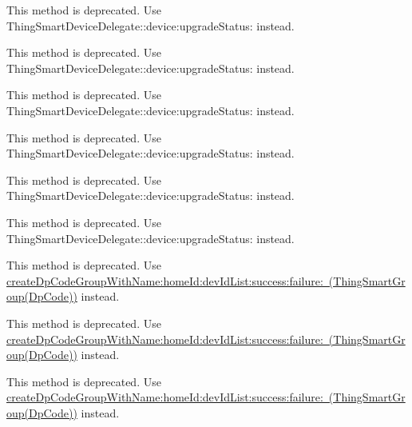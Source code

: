 \begin{DoxyRefList}
\label{deprecated__deprecated000152}%
%
This method is deprecated. Use Thing\+Smart\+Device\+Delegate\+::device\+:upgrade\+Status\+: instead. 

\label{deprecated__deprecated000140}%
%
This method is deprecated. Use Thing\+Smart\+Device\+Delegate\+::device\+:upgrade\+Status\+: instead.  
\item[Member \mbox{\hyperlink{protocol_thing_smart_device_delegate-p_aed42c5a3f89bae7659614f7a79b32e62}{\mbox{[}Thing\+Smart\+Device\+Delegate-\/p device\+Firmware\+Upgrading\+:type\+:\mbox{]}}} ]\label{deprecated__deprecated000136}%
%
This method is deprecated. Use Thing\+Smart\+Device\+Delegate\+::device\+:upgrade\+Status\+: instead. 

\label{deprecated__deprecated000148}%
%
This method is deprecated. Use Thing\+Smart\+Device\+Delegate\+::device\+:upgrade\+Status\+: instead. 

\label{deprecated__deprecated000154}%
%
This method is deprecated. Use Thing\+Smart\+Device\+Delegate\+::device\+:upgrade\+Status\+: instead. 

\label{deprecated__deprecated000142}%
%
This method is deprecated. Use Thing\+Smart\+Device\+Delegate\+::device\+:upgrade\+Status\+: instead.  
\item[(Dp\+Code) Member \mbox{\hyperlink{category_thing_smart_group_07_dp_code_08_a980daa55737ba056d7a3f311c9dab947}{\mbox{[}Thing\+Smart\+Group(Dp\+Code) create\+Dp\+Code\+Group\+With\+Name\+:home\+Id\+:category\+Code\+:dev\+Id\+List\+:success\+:failure\+:\mbox{]}}} ]\label{deprecated__deprecated000058}%
%
This method is deprecated. Use \mbox{\hyperlink{category_thing_smart_group_07_dp_code_08_a77b789fd26bba75504b33384b9157b92}{create\+Dp\+Code\+Group\+With\+Name\+:home\+Id\+:dev\+Id\+List\+:success\+:failure\+: (\+Thing\+Smart\+Group(\+Dp\+Code))}} instead. 

\label{deprecated__deprecated000022}%
%
This method is deprecated. Use \mbox{\hyperlink{category_thing_smart_group_07_dp_code_08_a77b789fd26bba75504b33384b9157b92}{create\+Dp\+Code\+Group\+With\+Name\+:home\+Id\+:dev\+Id\+List\+:success\+:failure\+: (\+Thing\+Smart\+Group(\+Dp\+Code))}} instead. 

\label{deprecated__deprecated000040}%
%
This method is deprecated. Use \mbox{\hyperlink{category_thing_smart_group_07_dp_code_08_a77b789fd26bba75504b33384b9157b92}{create\+Dp\+Code\+Group\+With\+Name\+:home\+Id\+:dev\+Id\+List\+:success\+:failure\+: (\+Thing\+Smart\+Group(\+Dp\+Code))}} instead. 


\end{DoxyRefList}
